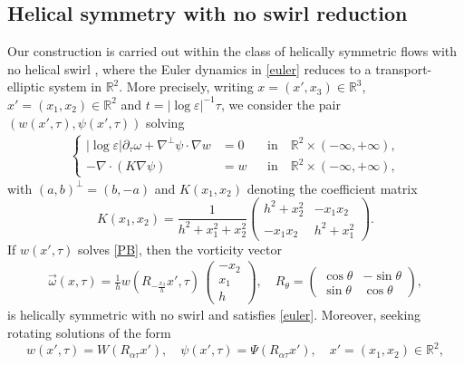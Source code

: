 \documentclass[11pt,reqno,a4paper]{amsart}
\numberwithin{equation}{section}
\newcommand{\R}{\mathbb{R}}
\newcommand{\ve}{\varepsilon}
\begin{document}
\subsection{Helical symmetry with no swirl reduction} 
Our construction is carried out within the class of helically symmetric flows with no helical swirl \cites{MR2505860,MR1717127}, where the Euler dynamics in \eqref{euler} reduces to a transport-elliptic system in $\R^2$. More precisely, writing $x=(x',x_3)\in\R^3$, $x'=(x_1,x_2)\in\R^2$ and  $t=|\log\ve|^{-1}\tau$, we consider the pair $\left(w(x',\tau),\psi(x',\tau)\right)$ solving
\begin{equation}\label{PB}
		\begin{aligned}
			\left\{
			\begin{aligned}
				|\log\ve|\partial_{\tau}\omega + \nabla^\perp \psi \cdot \nabla w &=0 && {\mbox {in}} \quad \R^2 \times (-\infty, +\infty),
				\\
				- \nabla\cdot (K \nabla \psi) &= w && {\mbox {in}} \quad \R^2 \times (-\infty,+\infty),
			\end{aligned}
			\right.
		\end{aligned}
	\end{equation}
	with $(a,b)^\perp = (b,-a)$ and $K (x_1,x_2) $ denoting the coefficient matrix
\[
	K(x_1 , x_2 ) = \frac{1}{h^2+x_1^2+x_2^2}
	\left(
	\begin{matrix}
		h^2+x_2^2 & -x_1  x_2\\
		-x_1 x_2 & h^2+x_1^2
	\end{matrix}
	\right).\]
If $w(x',\tau)$ solves \eqref{PB}, then the vorticity vector
	\begin{align}
\label{omegaHelical}
		\vec \omega(x,\tau)  =  \frac{1}{h} w\left( R_{-\frac {x_3}h} x',\tau\right)  \, \begin{pmatrix}-x_2\\x_1\\h\end{pmatrix}, \quad R_{\theta}=\begin{pmatrix} \cos\theta& -\sin\theta\\ \sin\theta& \cos\theta \end{pmatrix},
	\end{align}
	is helically symmetric with no swirl and satisfies \eqref{euler}. Moreover, seeking rotating solutions of the form
\begin{equation}
\label{rotansatz}
w (x', \tau) = W \left( R_{ \alpha \tau } x' \right), \quad \psi (x',\tau) = \Psi \left( R_{ \alpha \tau } x' \right), \quad x'=(x_1,x_2)\in\R^2,
\end{equation}
\end{document}
